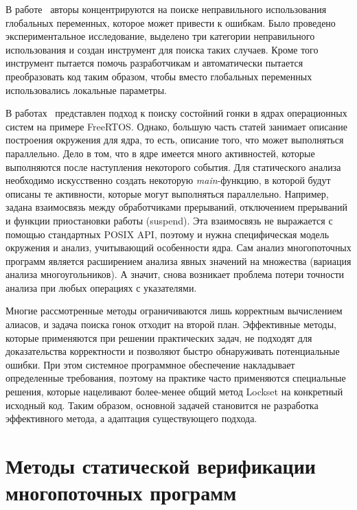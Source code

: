 В работе~\cite{Smith:2011:LGS} авторы концентрируются на поиске неправильного использования глобальных переменных, которое может привести к ошибкам.
Было проведено экспериментальное исследование, выделено три категории неправильного использования и создан инструмент для поиска таких случаев.
Кроме того инструмент пытается помочь разработчикам и автоматически пытается преобразовать код таким образом, чтобы вместо глобальных переменных использовались локальные параметры.

В работах~\cite{FreeRTOS,RacesFreeRtos} представлен подход к поиску состойний гонки в ядрах операционных систем на примере FreeRTOS. 
Однако, большую часть статей занимает описание построения окружения для ядра, то есть, описание того, что может выполняться параллельно. 
Дело в том, что в ядре имеется много активностей, которые выполняются после наступления некоторого события. 
Для статического анализа необходимо искусственно создать некоторую \textit{main}-функцию, в которой будут описаны те активности, которые могут выполняться параллельно. 
Например, задана взаимосвязь между обработчиками прерываний, отключением прерываний и функции приостановки работы (suspend). 
Эта взаимосвязь не выражается с помощью стандартных POSIX API, поэтому и нужна специфическая модель окружения и анализ, учитывающий особенности ядра. 
Сам анализ многопоточных программ является расширением анализа явных значений на множества (вариация анализа многоугольников).
А значит, снова возникает проблема потери точности анализа при любых операциях с указателями.

Многие рассмотренные методы ограничиваются лишь корректным вычислением алиасов, и задача поиска гонок отходит на второй план.
Эффективные методы, которые применяются при решении практических задач, не подходят для доказательства корректности и позволяют быстро обнаруживать потенциальные ошибки.
При этом системное программное обеспечение накладывает определенные требования, поэтому на практике часто применяются специальные решения, которые нацеливают более-менее общий метод Lockset на конкретный исходный код.
Таким образом, основной задачей становится не разработка эффективного метода, а адаптация существующего подхода.


\section{Методы статической верификации многопоточных программ}
\label{rw:bmc}

